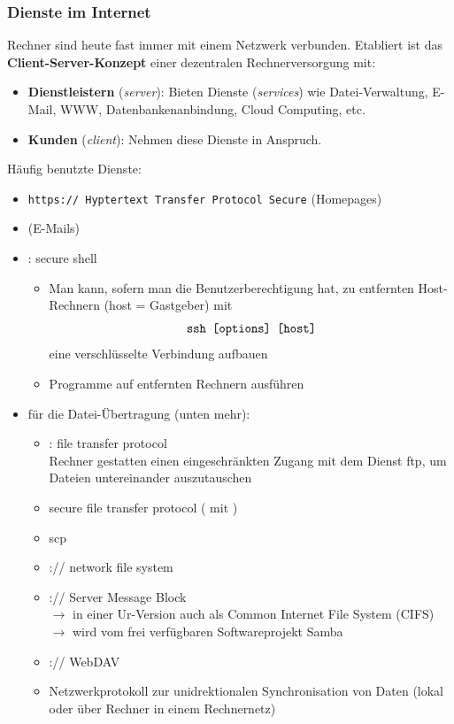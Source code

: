 \subsubsection{Dienste im Internet}
Rechner sind heute fast immer mit einem Netzwerk verbunden. Etabliert ist das \textbf{Client-Server-Konzept} einer dezentralen Rechnerversorgung mit:
\begin{itemize}
	\item \textbf{Dienstleistern} (\textit{server}): Bieten Dienste (\textit{services}) wie Datei-Verwaltung, E-Mail, WWW, Datenbankenanbindung, Cloud Computing, etc.
	\item \textbf{Kunden} (\textit{client}): Nehmen diese Dienste in Anspruch.
\end{itemize}
Häufig benutzte Dienste:
\begin{itemize}
	\item \texttt{https:// Hyptertext Transfer Protocol Secure} (Homepages)
	\item {} (E-Mails)
	\item {}: secure shell
	\begin{itemize}
		\item Man kann, sofern man die Benutzerberechtigung hat, zu entfernten Host-Rechnern (host = Gastgeber) mit
			$$\texttt{ssh [options] [host]}$$
		eine verschlüsselte Verbindung aufbauen
		\item Programme auf entfernten Rechnern ausführen
	\end{itemize}
	\item für die Datei-Übertragung (unten mehr):
	\begin{itemize}
		\item  {}: file transfer protocol \\
		Rechner gestatten einen eingeschränkten Zugang mit dem Dienst ftp, um Dateien untereinander auszutauschen
		\item {} secure file transfer protocol ( mit )
		\item scp
		\item {}:// network file system
		\item {}:// Server Message Block\\
		$\to$ in einer Ur-Version auch als Common Internet File System (CIFS)\\
		$\to$ wird vom frei verfügbaren Softwareprojekt Samba
		\item {}:// WebDAV
		\item {}  Netzwerkprotokoll zur unidrektionalen Synchronisation von Daten (lokal oder über Rechner in einem Rechnernetz)\\

\end{itemize}
\end{itemize}
